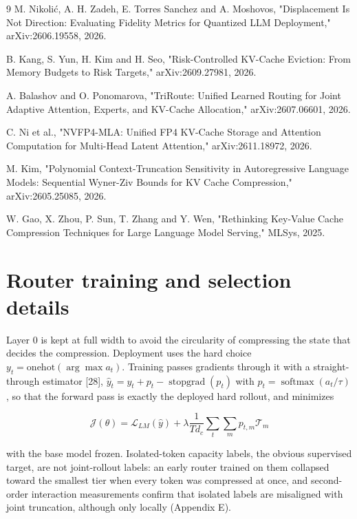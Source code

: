 \documentclass[10pt]{article}
\begin{document}
\begin{thebibliography}{9}
 M. Nikolić, A. H. Zadeh, E. Torres Sanchez and A. Moshovos, "Displacement Is Not Direction: Evaluating Fidelity Metrics for Quantized LLM Deployment," arXiv:2606.19558, 2026.

 B. Kang, S. Yun, H. Kim and H. Seo, "Risk-Controlled KV-Cache Eviction: From Memory Budgets to Risk Targets," arXiv:2609.27981, 2026.

 A. Balashov and O. Ponomarova, "TriRoute: Unified Learned Routing for Joint Adaptive Attention, Experts, and KV-Cache Allocation," arXiv:2607.06601, 2026.

 C. Ni et al., "NVFP4-MLA: Unified FP4 KV-Cache Storage and Attention Computation for Multi-Head Latent Attention," arXiv:2611.18972, 2026.

 M. Kim, "Polynomial Context-Truncation Sensitivity in Autoregressive Language Models: Sequential Wyner-Ziv Bounds for KV Cache Compression," arXiv:2605.25085, 2026.

 W. Gao, X. Zhou, P. Sun, T. Zhang and Y. Wen, "Rethinking Key-Value Cache Compression Techniques for Large Language Model Serving," MLSys, 2025.

\end{thebibliography}

\appendix

\section{Router training and selection details}

Layer 0 is kept at full width to avoid the circularity of compressing the state that decides the compression. Deployment uses the hard choice $y_t=\text{onehot}(\arg\max a_t)$. Training passes gradients through it with a straight-through estimator [28], $\hat y_t = y_t + p_t-\operatorname{stopgrad}(p_t)$ with $p_t=\operatorname{softmax}(a_t/\tau)$, so that the forward pass is exactly the deployed hard rollout, and minimizes

\[\mathcal J(\theta)=\mathcal L_{LM}(\hat y)+\lambda\frac{1}{Td_c}\sum_t\sum_{m}p_{t,m}\mathcal T_m\]

with the base model frozen. Isolated-token capacity labels, the obvious supervised target, are not joint-rollout labels: an early router trained on them collapsed toward the smallest tier when every token was compressed at once, and second-order interaction measurements confirm that isolated labels are misaligned with joint truncation, although only locally (Appendix E).
\end{document}
